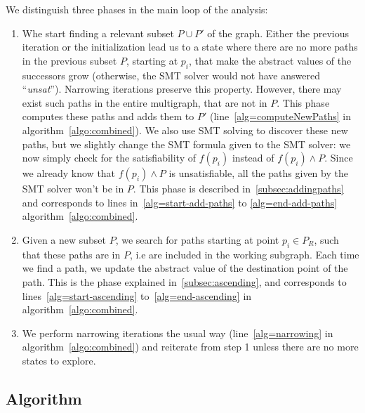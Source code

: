 \documentclass[preprint]{sigplanconf}
\newcommand{\MM}[1]{{\color{blue} TODO(MM): #1}}
\begin{document}
We distinguish three phases in the main loop of the analysis:
\begin{enumerate}
\item Whe start finding a relevant subset $P \cup P'$ of the graph.
  Either the previous iteration or the initialization lead us to a
  state where there are no more paths in the previous subset $P$,
  starting at $p_i$, that make the abstract values of the successors
  grow (otherwise, the SMT solver would not have answered
  ``\emph{unsat}''). Narrowing iterations preserve this property.
  However, there may exist such paths in the entire multigraph, that
  are not in $P$. This phase computes these paths and adds them to
  $P'$ (line~\ref{alg=computeNewPaths} in
  algorithm~\ref{algo:combined}). We also use SMT solving to discover
  these new paths, but we slightly change the SMT formula given to the
  SMT solver: we now simply check for the satisfiability of $f(p_i)$
  instead of $f(p_i) \wedge P$. Since we already know that $f(p_i)
  \wedge P$ is unsatisfiable, all the paths given by the SMT solver
  won't be in $P$. This phase is described in~\ref{subsec:addingpaths}
  and corresponds to lines in~\ref{alg=start-add-paths} to
  \ref{alg=end-add-paths} algorithm~\ref{algo:combined}.
\item Given a new subset $P$, we search for paths starting at point
  $p_i \in P_R$, such that these paths are in $P$, i.e are included in
  the working subgraph. Each time we find a path, we update the
  abstract value of the destination point of the path. This is the
  phase explained in~\ref{subsec:ascending}, and corresponds to
  lines~\ref{alg=start-ascending} to~\ref{alg=end-ascending} in
  algorithm~\ref{algo:combined}.
\item We perform narrowing iterations the usual way
  (line~\ref{alg=narrowing} in algorithm~\ref{algo:combined}) and
  reiterate from step 1 unless there are no more states to explore.
\end{enumerate}

%
%

\subsection{Algorithm}
\end{document}
